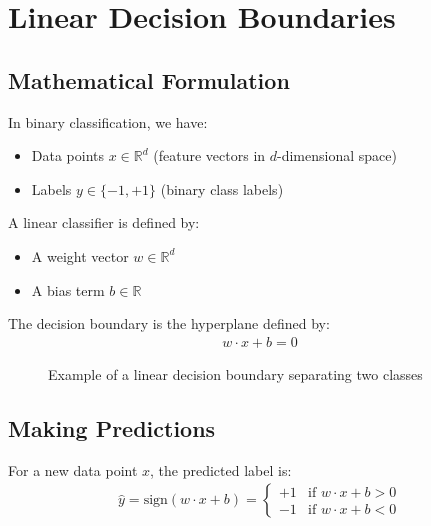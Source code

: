 \documentclass{article}
\begin{document}
\section{Linear Decision Boundaries}

\subsection{Mathematical Formulation}
In binary classification, we have:
\begin{itemize}
    \item Data points $x \in \mathbb{R}^d$ (feature vectors in $d$-dimensional space)
    \item Labels $y \in \{-1, +1\}$ (binary class labels)
\end{itemize}

A linear classifier is defined by:
\begin{itemize}
    \item A weight vector $w \in \mathbb{R}^d$
    \item A bias term $b \in \mathbb{R}$
\end{itemize}

The decision boundary is the hyperplane defined by:
\begin{align}
w \cdot x + b = 0
\end{align}

\begin{figure}[h]
\centering
{}
\caption{Example of a linear decision boundary separating two classes}
\end{figure}

\subsection{Making Predictions}
For a new data point $x$, the predicted label is:
\begin{align}
\hat{y} = \text{sign}(w \cdot x + b) = 
\begin{cases}
+1 & \text{if } w \cdot x + b > 0 \\
-1 & \text{if } w \cdot x + b < 0
\end{cases}
\end{align}
\end{document}
